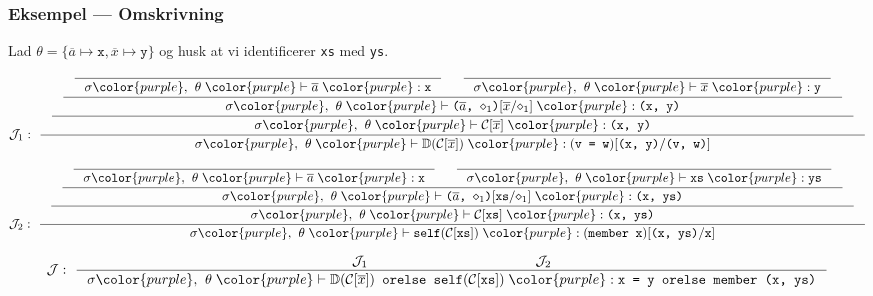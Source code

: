 \documentclass[slidestop,compress,mathserif, xcolor=dvipsnames]{beamer}
\newcommand{\ttt}[1]{\texttt{#1}}
\newcommand{\ol}[1]{\overline{#1}}
\def\TheTrueColour{purple}
\newcommand{\cc}[1]{{\color{\TheTrueColour}#1}}
\newcommand{\matchbody}[4]{\ensuremath{#1\cc{,}\mathrel{ }#2\mathrel{\cc{|-}}#3\mathrel{\cc{:}}#4}}
\begin{document}
\begin{frame}[fragile]
  \frametitle{Eksempel --- Omskrivning}

  \tiny Lad $\theta = \{\ol{a} \mapsto \ttt{x}, \ol{x} \mapsto
  \ttt{y}\}$ og husk at vi identificerer \ttt{xs} med \ttt{ys}.
  \begin{block}{}
    \tiny
    \[
    \mathcal{J}_1:\
    \inference
    {
      \inference
      {
        \inference
        {
          \inference
          {
          }
          {
            \matchbody
            {\sigma}
            {\theta}
            {\ol{a}}
            {\ttt{x}}
          } &
          \inference
          {
          }
          {
            \matchbody
            {\sigma}
            {\theta}
            {\ol{x}}
            {\ttt{y}}
          }
        }
        {
          \matchbody
          {\sigma}
          {\theta}
          {\ttt{($\ol{a}$, $\diamond_1$)$[\ol{x}/\diamond_1]$}}
          {\ttt{(x, y)}}
        }
      }
      {
        \matchbody
        {\sigma}
        {\theta}
        {\mathcal{C}[\ol{x}]}
        {\ttt{(x, y)}}
      }
    }
    {
      \matchbody
      {\sigma}
      {\theta}
      {\mathbb{D}(\mathcal{C}[\ol{x}])}
      {\ttt{$($v = w$)[$(x, y)$/$(v, w)$]$}}
    }
    \]
  \end{block}
  \begin{block}{}
    \[
    \mathcal{J}_2:\
    \inference
    {
      \inference
      {
        \inference
        {
          \inference
          {
          }
          {
            \matchbody
            {\sigma}
            {\theta}
            {\ol{a}}
            {\ttt{x}}
          } &
          \inference
          {
          }
          {
            \matchbody
            {\sigma}
            {\theta}
            {\ttt{xs}}
            {\ttt{ys}}
          }
        }
        {
          \matchbody
          {\sigma}
          {\theta}
          {\ttt{($\ol{a}$, $\diamond_1$)$[$xs$/\diamond_1]$}}
          {\ttt{(x, ys)}}
        }
      }
      {
        \matchbody
        {\sigma}
        {\theta}
        {\ttt{$\mathcal{C}[\ttt{xs}]$}}
        {\ttt{(x, ys)}}
      }
    }
    {
      \matchbody
      {\sigma}
      {\theta}
      {\ttt{self$(\mathcal{C}[\ttt{xs}])$}}
      {\ttt{$($member x$)[$(x, ys)$/$x$]$}}
    }
    \]
  \end{block}
  \begin{block}{}
    \tiny
    \[
    \mathcal{J}:\
    \inference
    {\mathcal{J}_1 & & & & & & & & \mathcal{J}_2}
    {
      \matchbody
      {\sigma}
      {\theta}
      {\ttt{$\mathbb{D}(\mathcal{C}[\ol{x}])$ orelse self$(\mathcal{C}[\ttt{xs}])$}}
      {\ttt{x = y orelse member (x, ys)}}
    }
    \]
  \end{block}
\end{frame}
\end{document}
